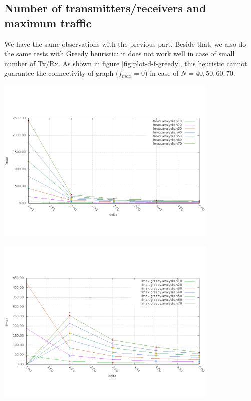 \documentclass[a4paper]{article}
\begin{document}
  \subsection{Number of transmitters/receivers and maximum traffic}
  We have the same observations with the previous part. Beside that, we also do the same tests with Greedy heuristic: it does not work well in case of small number of Tx/Rx. As shown in figure \ref{fig:plot-d-f-greedy}, this heuristic cannot guarantee the connectivity of graph ($f_{max}=0$) in case of $N=40,50,60,70$.
    \begin{center}
    \includegraphics[width=0.8\textwidth]{random-ring-results/plot_d_f.png}
    \label{fig:plot-d-f-ring}
    \end{center}
    \begin{center}
    \includegraphics[width=0.8\textwidth]{greedy-results/plot_d_f.png}
    \label{fig:plot-d-f-greedy}
    \end{center}
\end{document}
